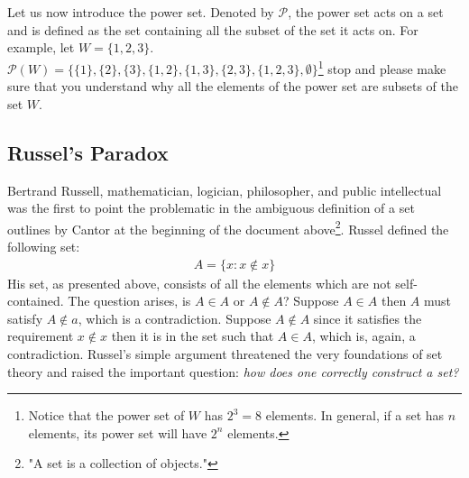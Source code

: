 \documentclass{tufte-handout} %
\theoremstyle{definition}
\theoremstyle{remark}
\begin{document}
\begin{minipage}[t]{0.30\textwidth}
    \centering
\end{minipage}
\\\\
Let us now introduce the power set. Denoted by $\mathcal{P}$, the power set acts on a set and is defined as the set containing all the subset of the set it acts on. For example, let $W = \{1,2,3\}$. $\mathcal{P}(W)=\{\{1\},\{2\},\{3\},\{1,2\},\{1,3\}, \{2,3\}, \{1,2,3\}, \emptyset\}$\footnote{Notice that the power set of $W$ has $2^{3}=8$ elements. In general, if a set has $n$ elements, its power set will have $2^{n}$ elements.} stop and please make sure that you understand why all the elements of the power set are subsets of the set $W$.
\subsection{Russel's Paradox}
Bertrand Russell, mathematician, logician, philosopher, and public intellectual was the first to point the problematic in the ambiguous definition of a set outlines by Cantor at the beginning of the document above\footnote{"A set is a collection of objects."}. Russel defined the following set:
\begin{align*}
    A = \{x: x\not\in x\}
\end{align*}
His set, as presented above, consists of all the elements which are not self-contained. The question arises, is $A\in A$ or $A\not\in A$? Suppose $A\in A$ then $A$ must satisfy $A\not\in a$, which is a contradiction. Suppose $A\not\in A$ since it satisfies the requirement $x\not\in x$ then it is in the set such that $A\in A$, which is, again, a contradiction. Russel's simple argument threatened the very foundations of set theory and raised the important question: \textit{how does one correctly construct a set?}
\end{document}
